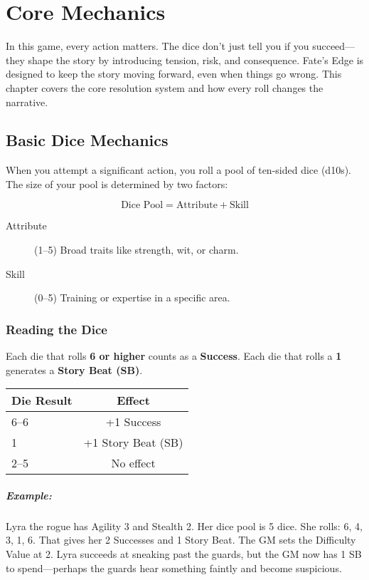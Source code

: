 \chapter{Core Mechanics} \label{ch:core-mechanics}

In this game, every action matters. The dice don't just tell you if you succeed—they shape the story by introducing tension, risk, and consequence. Fate's Edge is designed to keep the story moving forward, even when things go wrong. This chapter covers the core resolution system and how every roll changes the narrative.

\section{Basic Dice Mechanics} 

When you attempt a significant action, you roll a pool of ten-sided dice (d10s). The size of your pool is determined by two factors:

\[
\text{Dice Pool} = \text{Attribute} + \text{Skill}
\]

\begin{description}
  \item[Attribute] (1--5) Broad traits like strength, wit, or charm. 
  \item[Skill] (0--5) Training or expertise in a specific area. 
\end{description}

\subsection*{Reading the Dice}

Each die that rolls \textbf{6 or higher} counts as a \textbf{Success}.  
Each die that rolls a \textbf{1} generates a \textbf{Story Beat (SB)}.

\begin{center}
\small
\begin{tabular}{lc}
\toprule
\textbf{Die Result} & \textbf{Effect} \\
\midrule
6--6 & +1 Success \\
1 & +1 Story Beat (SB) \\
2--5 & No effect \\
\bottomrule
\end{tabular}
\end{center}

\paragraph{Example:}  
Lyra the rogue has Agility 3 and Stealth 2. Her dice pool is 5 dice. She rolls: 6, 4, 3, 1, 6. That gives her 2 Successes and 1 Story Beat. The GM sets the Difficulty Value at 2. Lyra succeeds at sneaking past the guards, but the GM now has 1 SB to spend—perhaps the guards hear something faintly and become suspicious.

